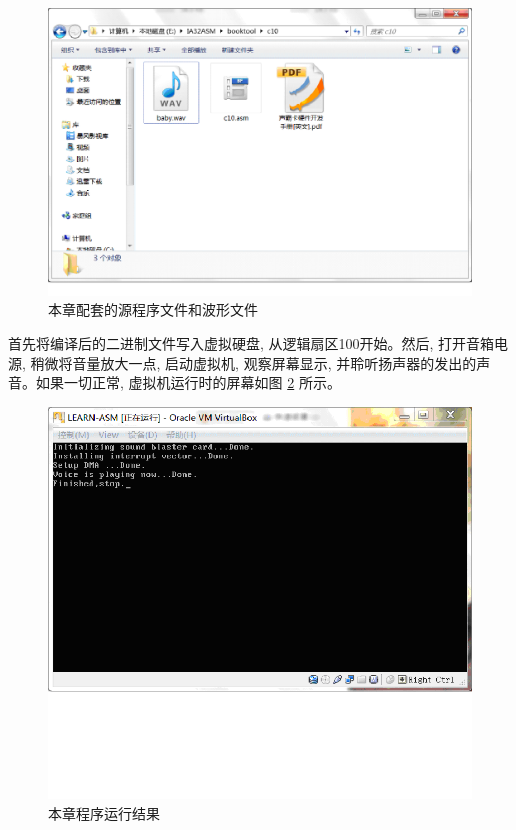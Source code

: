 \documentclass[12pt]{article}
\begin{document}
\begin{CJK}{UTF8}{gbsn}
\begin{figure}
\begin{center}
\includegraphics[width=\textwidth]{eps/10-10.bmp.eps}
\caption{本章配套的源程序文件和波形文件}\label{src_code}
\end{center}
\end{figure}

首先将编译后的二进制文件写入虚拟硬盘, 从逻辑扇区100开始。然后, 打开音箱电源, 稍微将音量放大一点, 启动虚拟机, 观察屏幕显示, 并聆听扬声器的发出的声音。如果一切正常, 虚拟机运行时的屏幕如图 \ref{result} 所示。
 
\begin{figure}
\begin{center}
\includegraphics[width=\textwidth]{eps/10-11.bmp.eps}
\caption{本章程序运行结果}\label{result}
\end{center}
\end{figure}


\end{CJK}
\end{document}
